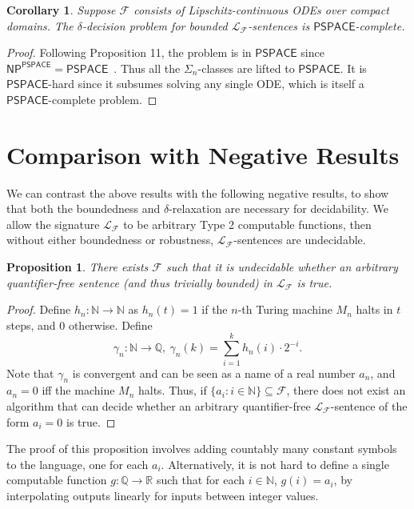 \documentclass[conference]{IEEEtran}
\newtheorem{proposition}[theorem]{Proposition}
\newtheorem{corollary}[theorem]{Corollary}
\begin{document}
\begin{corollary}
Suppose $\mathcal{F}$ consists of Lipschitz-continuous ODEs over compact domains. The $\delta$-decision problem for bounded $\mathcal{L}_{\mathcal{F}}$-sentences is $\mathsf{PSPACE}$-complete. 
\end{corollary}

\begin{proof}
Following Proposition 11, the problem is in $\mathsf{PSPACE}$ since $\mathsf{NP}^{\mathsf{PSPACE}}=\mathsf{PSPACE}$~\cite{phold}. Thus all the $\Sigma_n$-classes are lifted to $\mathsf{PSPACE}$. It is $\mathsf{PSPACE}$-hard since it subsumes solving any single ODE, which is itself a $\mathsf{PSPACE}$-complete problem.
\end{proof}

\section{Comparison with Negative Results}\label{negative}

We can contrast the above results with the following negative results, to show that both the boundedness and $\delta$-relaxation are necessary for decidability. We allow the signature $\mathcal{L}_{\mathcal{F}}$ to be arbitrary Type 2 computable functions, then without either boundedness or robustness, $\mathcal{L}_{\mathcal{F}}$-sentences are undecidable. 

\begin{proposition}
There exists $\mathcal{F}$ such that it is undecidable whether an arbitrary quantifier-free sentence (and thus trivially bounded) in $\mathcal{L}_{\mathcal{F}}$ is true. 
\end{proposition}

\begin{proof}
Define $h_n: \mathbb{N}\rightarrow \mathbb{N}$ as $h_n(t)=1$ if the $n$-th Turing machine $M_n$ halts in $t$ steps, and 0 otherwise. Define
$$\gamma_n: \mathbb{N}\rightarrow \mathbb{Q},\ \gamma_n(k) = \sum_{i=1}^k h_n(i)\cdot2^{-i}.$$ 
Note that $\gamma_n$ is convergent and can be seen as a name of a real number $a_n$, and $a_n=0$ iff the machine $M_n$ halts. Thus, if $\{a_i:i\in \mathbb{N}\}\subseteq \mathcal{F}$, there does not exist an algorithm that can decide whether an arbitrary quantifier-free $\mathcal{L}_{\mathcal{F}}$-sentence of the form $a_i=0$ is true. 
\end{proof}

The proof of this proposition involves adding countably many constant symbols to the language, one for each $a_i$. Alternatively, it is not hard to define a single computable function $g : \mathbb Q \to \mathbb R$ such that for each $i \in \mathbb N$, $g(i) = a_i$, by interpolating outputs linearly for inputs between integer values.
\end{document}
